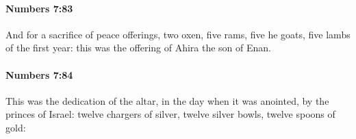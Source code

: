 		\paragraph{Numbers 7:83} %
			\label{NUMBERS-7-83}

			And for a sacrifice of peace offerings, two oxen, five rams, five he goats, five lambs of the first year: this was the offering of Ahira the son of Enan.


		\paragraph{Numbers 7:84} %
			\label{NUMBERS-7-84}

			This was the dedication of the altar, in the day when it was anointed, by the princes of Israel: twelve chargers of silver, twelve silver bowls, twelve spoons of gold:



